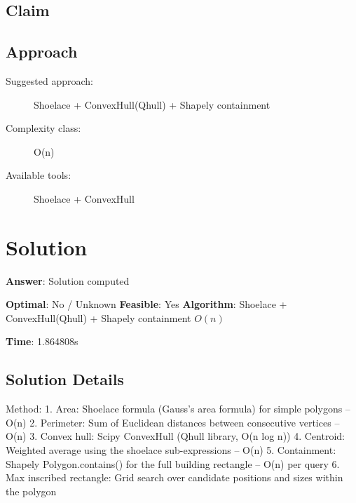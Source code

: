 \documentclass[11pt, a4paper]{article}
\begin{document}
\subsection{Claim}


\subsection{Approach}

\begin{description}
  \item[Suggested approach:] Shoelace + ConvexHull(Qhull) + Shapely containment
  \item[Complexity class:] O(n)
  \item[Available tools:] Shoelace + ConvexHull
\end{description}
\section{Solution}

\begin{polyaresult}

\textbf{Answer}: Solution computed


\textbf{Optimal}: No / Unknown \hfill
\textbf{Feasible}: Yes
\textbf{Algorithm}: Shoelace + ConvexHull(Qhull) + Shapely containment \quad $O(n)$

\textbf{Time}: 1.864808s


\end{polyaresult}

\subsection{Solution Details}


Method: 1. Area: Shoelace formula (Gauss's area formula) for simple polygons -- O(n)
2. Perimeter: Sum of Euclidean distances between consecutive vertices -- O(n)
3. Convex hull: Scipy ConvexHull (Qhull library, O(n log n))
4. Centroid: Weighted average using the shoelace sub-expressions -- O(n)
5. Containment: Shapely Polygon.contains() for the full building rectangle -- O(n) per query
6. Max inscribed rectangle: Grid search over candidate positions and sizes within the polygon
\end{document}
